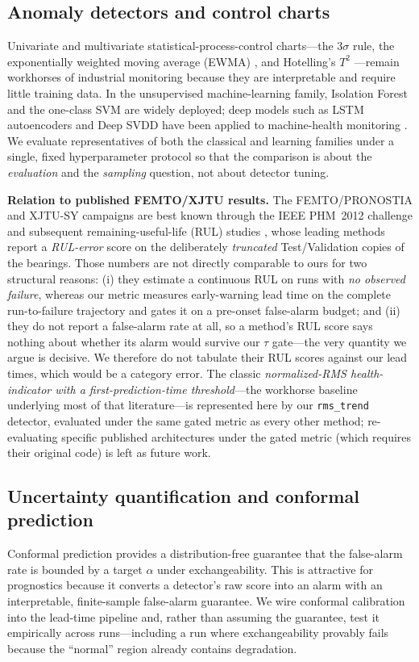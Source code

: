 \documentclass[journal]{IEEEtran}
\begin{document}
\subsection{Anomaly detectors and control charts}
Univariate and multivariate statistical-process-control charts---the
3$\sigma$ rule, the exponentially weighted moving average (EWMA)
\cite{roberts1959}, and Hotelling's $T^2$ \cite{hotelling1947}---remain
workhorses of industrial monitoring \cite{montgomery2009} because they are
interpretable and require little training data. In the unsupervised
machine-learning family, Isolation Forest \cite{liu2008} and the one-class SVM
\cite{scholkopf2001} are widely deployed; deep models such as LSTM
autoencoders \cite{hochreiter1997,malhotra2016,hundman2018} and Deep SVDD
\cite{ruff2018} have been applied to machine-health monitoring \cite{zhao2019}.
We evaluate representatives of both the classical and learning families under a
single, fixed hyperparameter protocol so that the comparison is about the
\emph{evaluation} and the \emph{sampling} question, not about detector tuning.

\textbf{Relation to published FEMTO/XJTU results.} The FEMTO/PRONOSTIA and XJTU-SY
campaigns are best known through the IEEE PHM~2012 challenge and subsequent
remaining-useful-life (RUL) studies \cite{nectoux2012,wang2020}, whose leading methods
report a \emph{RUL-error} score on the deliberately \emph{truncated} Test/Validation
copies of the bearings. Those numbers are not directly comparable to ours for two
structural reasons: (i) they estimate a continuous RUL on runs with \emph{no observed
failure}, whereas our metric measures early-warning lead time on the complete
run-to-failure trajectory and gates it on a pre-onset false-alarm budget; and (ii) they
do not report a false-alarm rate at all, so a method's RUL score says nothing about
whether its alarm would survive our $\tau$ gate---the very quantity we argue is
decisive. We therefore do not tabulate their RUL scores against our lead times, which
would be a category error. The classic \emph{normalized-RMS health-indicator with a
first-prediction-time threshold}---the workhorse baseline underlying most of that
literature---is represented here by our \texttt{rms\_trend} detector, evaluated under
the same gated metric as every other method; re-evaluating specific published
architectures under the gated metric (which requires their original code) is left as
future work.

\subsection{Uncertainty quantification and conformal prediction}
Conformal prediction \cite{vovk2005,laxhammar2014} provides a distribution-free
guarantee that the false-alarm rate is bounded by a target $\alpha$ under
exchangeability. This is attractive for prognostics because it converts a
detector's raw score into an alarm with an interpretable, finite-sample
false-alarm guarantee. We wire conformal calibration into the lead-time
pipeline and, rather than assuming the guarantee, test it empirically across
runs---including a run where exchangeability provably fails because the
``normal'' region already contains degradation.
\end{document}
